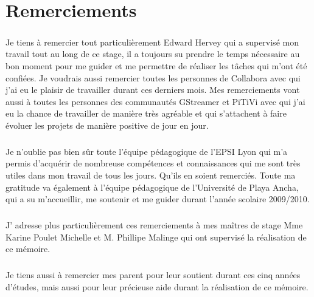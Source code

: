 \newpage \chapter*{Remerciements}

\paragraph {}

Je tiens à remercier tout particulièrement Edward Hervey qui a
supervisé mon travail tout au long de ce stage, il a toujours su prendre
le temps nécessaire au bon moment pour me guider et me permettre
de réaliser les tâches qui m'ont été confiées.
Je voudrais aussi remercier toutes les personnes de Collabora
avec qui j'ai eu le plaisir de travailler durant ces derniers mois.
Mes remerciements vont aussi à toutes les personnes des communautés GStreamer
et PiTiVi avec qui j'ai eu la chance de travailler de manière très
agréable et qui s'attachent à faire évoluer les projets de manière
positive de jour en jour.

\paragraph {}

Je n'oublie pas bien sûr toute l'équipe pédagogique de l'EPSI Lyon
qui m'a permis d'acquérir de nombreuse compétences et connaissances
qui me sont très utiles dans mon travail de tous les jours. Qu'ils en soient remerciés.
Toute ma gratitude va également à l'équipe pédagogique de l'Université de Playa Ancha,
qui a su m'accueillir, me soutenir et me guider durant l'année scolaire 2009/2010.

\paragraph {}

J' adresse plus particulièrement ces remerciements à mes maîtres de
stage Mme Karine Poulet Michelle et M. Phillipe Malinge qui ont
supervisé la réalisation de ce mémoire.

\paragraph {}

Je tiens aussi à remercier mes parent pour leur soutient durant ces
cinq années d'études, mais aussi pour leur précieuse aide durant la
réalisation de ce mémoire.

